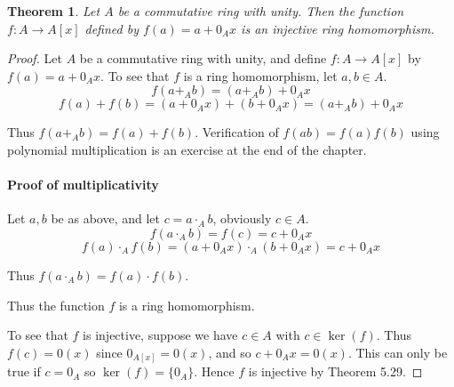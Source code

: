 \documentclass[letterpaper, 12pt]{article}
\newtheorem{thm}{Theorem}
\begin{document}
			\begin{thm}
			Let $A$ be a commutative ring with unity. 
			Then the function $f : A \to A[x]$ defined by $f(a) = a + 0_{A}x$ is an injective ring homomorphism.
			\end{thm}
			\color{ForestGreen}
			\begin{proof}
			Let $A$ be a commutative ring with unity, and define $f : A \to A[x]$ by $f(a) = a + 0_{A}x$. 
			To see that $f$ is a ring homomorphism, let $a, b \in A$.
			\[ f(a +_{A} b) = (a +_{A} b) + 0_{A}x \]
			\[ f(a) + f(b) = (a + 0_{A}x) + (b + 0_{A}x) = (a +_{A} b) + 0_{A}x \]

			Thus $f(a +_{A} b) = f(a) + f(b)$. 
			Verification of $f(ab) = f(a)f(b)$ using polynomial multiplication is an exercise at the end of the chapter.
			
			\color{blue}
			\paragraph*{\color{blue} Proof of multiplicativity}
			\label{par:proof_of_multiplicativity}
			Let $a,b$ be as above, and let $c = a \cdot_{A} b$, obviously $c \in A$.
			\[ f(a \cdot_{A} b) = f(c) = c + 0_{A}x \]
			\[ f(a) \cdot_{A} f(b) = (a + 0_{A}x) \cdot_{A} (b + 0_{A}x) = c + 0_{A}x \]

			Thus $f(a \cdot_{A} b) = f(a) \cdot f(b)$.
			\vspace*{5mm}
			\color{ForestGreen}

			Thus the function $f$ is a ring homomorphism.

			To see that $f$ is injective, suppose we have $c \in A$ with $c \in \ker(f)$. 
			Thus $f(c) = 0(x)$ since $0_{A[x]} = 0(x)$, and so $c + 0_{A}x= 0(x)$. 
			This can only be true if $c = 0_{A}$ so $\ker(f) = \{0_{A}\}$. 
			Hence $f$ is injective by Theorem 5.29.
			\end{proof}
			\color{black}
\end{document}
